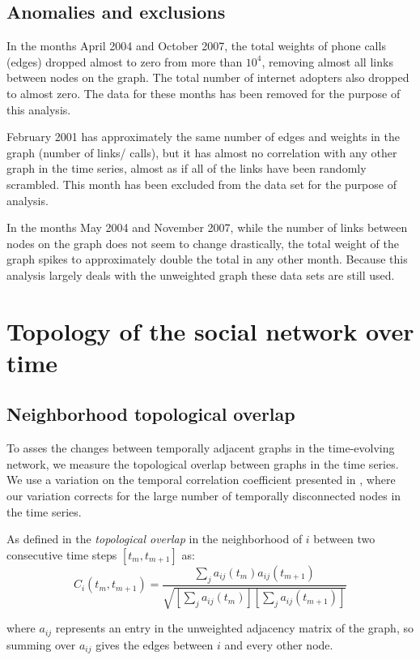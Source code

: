 \documentclass[12pt]{article}
\begin{document}
\subsection{Anomalies and exclusions}
In the months April 2004 and October 2007, the total weights of phone calls (edges) dropped almost to zero from more than \(10^4\), removing almost all links between nodes on the graph. The total number of internet adopters also dropped to almost zero. The data for these months has been removed for the purpose of this analysis.

February 2001 has approximately the same number of edges and weights in the graph (number of links/ calls), but it has almost no correlation with any other graph in the time series, almost as if all of the links have been randomly scrambled. This month has been excluded from the data set for the purpose of analysis.

In the months May 2004 and November 2007, while the number of links between nodes on the graph does not seem to change drastically, the total weight of the graph spikes to approximately double the total in any other month. Because this analysis largely deals with the unweighted graph these data sets are still used.

\section{Topology of the social network over time}

\subsection{Neighborhood topological overlap}

To asses the changes between temporally adjacent graphs in the time-evolving network, we measure the topological overlap between graphs in the time series. We use a variation on the temporal correlation coefficient presented in \cite{3}, where our variation corrects for the large number of temporally disconnected nodes in the time series.

As defined in \cite{3}  the \emph{topological overlap} in the neighborhood of \(i\) between two consecutive time steps \([t_m,t_{m+1}]\) as:
\begin{equation}
C_i(t_m,t_{m+1}) = \frac{ \sum_j a_{ij}(t_m)a_{ij}(t_{m+1})}{\sqrt{[ \sum_j a_{ij}(t_m)][ \sum_j a_{ij}(t_{m+1})]}}
\label{eq:Ci}
\end{equation}

where \(a_{ij}\) represents an entry in the unweighted adjacency matrix of the graph, so summing over \(a_{ij}\) gives the edges between \(i\) and every other node.
\end{document}
